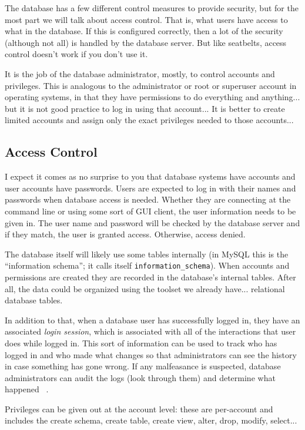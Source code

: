 The database has a few different control measures to provide security, but for the most part we will talk about access control. That is, what users have access to what in the database. If this is configured correctly, then a lot of the security (although not all) is handled by the database server. But like seatbelts, access control doesn't work if you don't use it.

It is the job of the database administrator, mostly, to control accounts and privileges. This is analogous to the administrator or root or superuser account in operating systems, in that they have permissions to do everything and anything... but it is not good practice to log in using that account... It is better to create limited accounts and assign only the exact privileges needed to those accounts...

\subsection*{Access Control}

I expect it comes as no surprise to you that database systems have accounts and user accounts have passwords. Users are expected to log in with their names and passwords when database access is needed. Whether they are connecting at the command line or using some sort of GUI client, the user information needs to be given in. The user name and password will be checked by the database server and if they match, the user is granted access. Otherwise, access denied.

The database itself will likely use some tables internally (in MySQL this is the ``information schema''; it calls itself \texttt{information\_schema}). When accounts and permissions are created they are recorded in the database's internal tables. After all, the data could be organized using the toolset we already have... relational database tables. 

In addition to that, when a database user has successfully logged in, they have an associated \textit{login session}, which is associated with all of the interactions that user does while logged in. This sort of information can be used to track who has logged in and who made what changes so that administrators can see the history in case something has gone wrong. If any malfeasance is suspected, database administrators can audit the logs (look through them) and determine what happened ~\cite{fds}.  

Privileges can be given out at the account level: these are per-account and includes the create schema, create table, create view, alter, drop, modify, select... 

